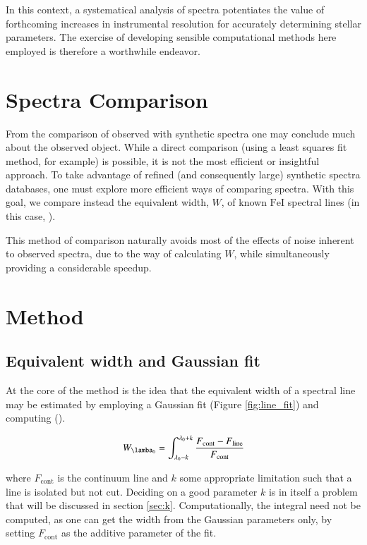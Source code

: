 \documentclass{aa}
\begin{document}
In this context, a systematical analysis of spectra potentiates the value of
forthcoming increases in instrumental resolution for accurately determining
stellar parameters. The exercise of developing sensible computational methods
here employed is therefore a worthwhile endeavor.

\section{Spectra Comparison}

From the comparison of observed with synthetic spectra one may conclude
much about the observed object. While a direct comparison (using a least squares
fit method, for example) is possible, it is not the most efficient or insightful
approach. To take advantage of refined (and consequently large) synthetic spectra
databases, one must explore more efficient ways of comparing spectra. With this
goal, we compare instead the equivalent width, $W$, of known $\mathrm{FeI}$
spectral lines (in this case, \cite{tsantaki_deriving_2013}).

This method of comparison naturally avoids most of the effects of noise inherent to
observed spectra, due to the way of calculating $W$, while simultaneously providing a
considerable speedup.

\section{Method}

\subsection{Equivalent width and Gaussian fit}

At the core of the method is the idea that the equivalent width of a spectral
line may be estimated by employing a Gaussian fit (Figure
\ref{fig:line_fit}) and computing (\cite{monteiro_sebenta_2019}).

\begin{equation}
  \label{eq:W_estimation}
  W_{\lamba_0} = \int_{\lambda_0 - k}^{\lambda_0 + k} \frac{F_{\text{cont}} - F_{\text{line}}}{F_{\text{cont}}}
\end{equation}

where $F_{\text{cont}}$ is the continuum line and $k$ some appropriate
limitation such that a line is isolated but not cut. Deciding on a good
parameter $k$ is in itself a problem that will be discussed in section \ref{sec:k}.
Computationally, the integral need not be computed, as one can get the width from the Gaussian
parameters only, by setting $F_{\text{cont}}$ as the additive parameter of the fit.
\end{document}
